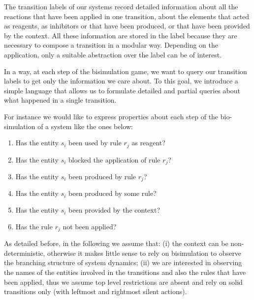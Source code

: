 The transition labels of our systems record detailed information about all the reactions that have been applied in one transition, about the elements that acted as reagents, as inhibitors or that have been produced, or that have been provided by the context.
All these information are stored in the label because they are necessary to compose a transition in a modular way. Depending on the application, only a suitable abstraction over the label can be of interest.

In a way, at each step of the bisimulation game, we want to query our transition labels to get only the information we care about.
To this goal, we introduce a simple language
that allows us to formulate detailed and partial queries about what happened in a single transition.

\begin{example} \label{properties_ex}
For instance we would like to express properties about each step of the bio-simulation of a system like the ones below:
\begin{enumerate}
\item Has the entity $s_i$ been used by rule $r_j$ as reagent?
\item Has the entity $s_i$ blocked the application of  rule $r_j$?
\item Has the entity $s_i$ been produced by rule $r_j$?
\item Has the entity $s_i$ been produced by some rule?
\item Has the entity $s_i$ been provided by the context? 
\item Has the rule $r_j$ not been applied? 
\end{enumerate}
\end{example}

As detailed before, in the following we assume that: (i) the context can be non-deterministic, otherwise it makes little sense to rely on bisimulation to observe the branching structure of system dynamics; (ii) we are interested in observing the names of the entities involved in the transitions and also the rules that have been applied, thus we assume top level restrictions are absent and rely on solid transitions only (with leftmost and rightmost silent actions).

